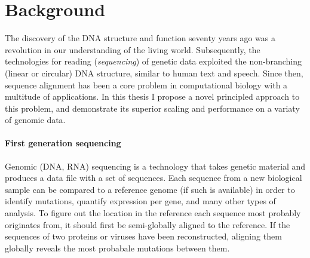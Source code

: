 \section*{Background}

The discovery of the DNA structure and function\citep{watson1953structure}
seventy years ago was a revolution in our understanding of the living world.
Subsequently, the technologies for reading (\emph{sequencing}) of genetic data
exploited the non-branching (linear or circular) DNA structure, similar to human
text and speech. Since then, sequence alignment has been a core problem in
computational biology with a multitude of applications. In this thesis I propose
a novel principled approach to this problem, and demonstrate its superior
scaling and performance on a variaty of genomic data.

\paragraph{First generation sequencing}
Genomic (DNA, RNA) sequencing is a technology that takes genetic material and
produces a data file with a set of sequences. Each sequence from a new
biological sample can be compared to a reference genome (if such is available)
in order to identify mutations, quantify expression per gene, and many other
types of analysis. To figure out the location in the reference each sequence
most probably originates from, it should first be semi-globally aligned to the
reference. If the sequences of two proteins or viruses have been reconstructed,
aligning them globally reveals the most probabale mutations between them.


